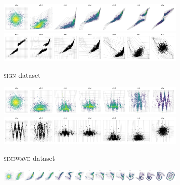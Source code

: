 \begin{figure}[!htb]\ContinuedFloat
  \begin{center}
    \begin{subfigure}{\linewidth}
        \centering
        \includegraphics[width=\linewidth,trim=0cm 0cm 0cm 1.6cm, clip]{figures/2D/SIGN/plot_generative_flow_evolution.png}
        \includegraphics[width=\linewidth,trim=0cm 0cm 0cm 1.6cm, clip]{figures/2D/SIGN/plot_normalizing_flow_evolution.png}
        \caption{\textsc{sign} dataset}
        \label{fig:NF_2D_SIGN}
    \end{subfigure}
    \vspace{1em}
    \begin{subfigure}{\linewidth}
      \centering
      \includegraphics[width=\linewidth,trim=0cm 0cm 0cm 1.6cm, clip]{figures/2D/SINEWAVE/plot_generative_flow_evolution.png}
      \includegraphics[width=\linewidth,trim=0cm 0cm 0cm 1.6cm, clip]{figures/2D/SINEWAVE/plot_normalizing_flow_evolution.png}
      \caption{\textsc{sinewave} dataset}
      \label{fig:NF_2D_SINEWAVE}
    \end{subfigure}
    \vspace{1em}
    \begin{subfigure}{\linewidth}
      \centering
      \includegraphics[width=\linewidth,trim=0cm 0cm 0cm 1.6cm, clip]{figures/2D/TWOSPIRALS/plot_generative_flow_evolution.png}

\end{subfigure}
\end{center}
\end{figure}
